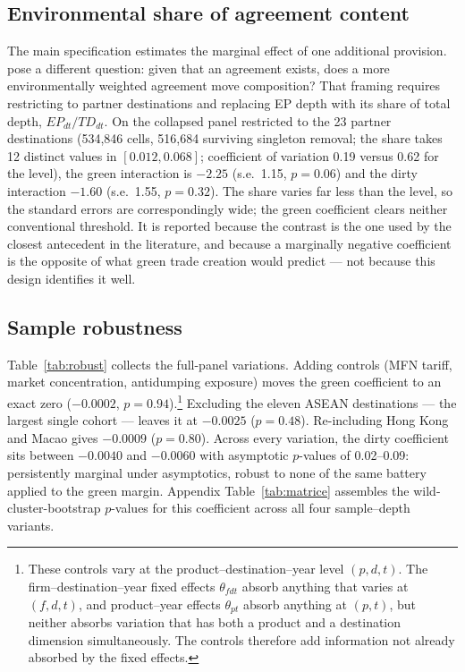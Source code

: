 \documentclass[12pt]{article}
\begin{document}


\subsection{Environmental share of agreement content}

The main specification estimates the marginal effect of one additional provision.
\citet{abman2024} pose a different question: given that an agreement exists, does a more
environmentally weighted agreement move composition? That framing requires restricting to
partner destinations and replacing EP depth with its share of total depth,
$EP_{dt}/TD_{dt}$. On the collapsed panel restricted to the 23 partner destinations
(534{,}846 cells, 516{,}684 surviving singleton removal; the share takes 12 distinct values
in $[0.012, 0.068]$; coefficient of variation 0.19 versus 0.62 for the level), the green
interaction is $-2.25$ (s.e.\ 1.15, $p = 0.06$) and the dirty interaction $-1.60$
(s.e.\ 1.55, $p = 0.32$). The share varies far less than the level, so the standard
errors are correspondingly wide; the green coefficient clears neither conventional
threshold. It is reported because the contrast is the one used by the closest antecedent
in the literature, and because a marginally negative coefficient is the opposite of what
green trade creation would predict --- not because this design identifies it well.

\subsection{Sample robustness}

Table~\ref{tab:robust} collects the full-panel variations. Adding controls (MFN tariff,
market concentration, antidumping exposure) moves the green coefficient to an exact zero
($-0.0002$, $p = 0.94$).\footnote{These controls vary at the product--destination--year level $(p,d,t)$. The firm--destination--year fixed effects $\theta_{fdt}$ absorb anything that varies at $(f,d,t)$, and product--year effects $\theta_{pt}$ absorb anything at $(p,t)$, but neither absorbs variation that has both a product and a destination dimension simultaneously. The controls therefore add information not already absorbed by the fixed effects.} Excluding the eleven ASEAN destinations --- the largest single
cohort --- leaves it at $-0.0025$ ($p = 0.48$). Re-including Hong Kong and Macao gives
$-0.0009$ ($p = 0.80$). Across every variation, the dirty coefficient sits between
$-0.0040$ and $-0.0060$ with asymptotic $p$-values of 0.02--0.09: persistently marginal
under asymptotics, robust to none of the same battery applied to the green margin.
Appendix Table~\ref{tab:matrice} assembles the wild-cluster-bootstrap $p$-values for this coefficient across all four sample--depth variants.
\end{document}
